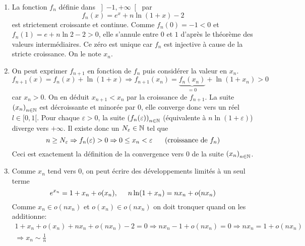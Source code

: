 \begin{enumerate}
  \item La fonction $f_n$ définie dans $\left] -1,+\infty\right[ $ par
\begin{displaymath}
  f_n(x) = e^x + n\ln(1+x) - 2
\end{displaymath}
est strictement croissante et continue. Comme $f_n(0)=-1<0$ et $f_n(1)=e+n\ln 2 - 2>0$, elle s'annule entre $0$ et $1$ d'après le théorème des valeurs intermédiaires. Ce zéro est unique car $f_n$ est injective à cause de la stricte croissance. On le note $x_n$.
  
  \item On peut exprimer $f_{n+1}$ en fonction de $f_n$ puis considérer la valeur en $x_n$.
\begin{displaymath}
f_{n+1}(x) = f_n(x) + \ln(1+x) \Rightarrow f_{n+1}(x_n) = \underset{=0}{\underbrace{f_n(x_n)}} + \ln(1+x_n) > 0
\end{displaymath}
car $x_n>0$. On en déduit $x_{n+1} < x_n$ par la croissance de $f_{n+1}$. La suite $\left( x_n\right)_{n\in \mathbb{N}}$ est décroissante et minorée par $0$, elle converge donc vers un réel $l\in [0,1[$.\newline
Pour chaque $\varepsilon >0$, la suite $\left( f_n(\varepsilon)\right)_{n\in \mathbb{N}}$ (équivalente à $n\ln(1+\varepsilon)$) diverge vers $+\infty$.\newline
Il existe donc un $N_\varepsilon\in \mathbb{N}$ tel que 
\begin{displaymath}
n\geq N_\varepsilon \Rightarrow f_n(\varepsilon) > 0 \Rightarrow 0 \leq x_n < \varepsilon\hspace{0.5cm}\text{ (croissance de $f_n$)} 
\end{displaymath}
Ceci est exactement la définition de la convergence vers $0$ de la suite $\left( x_n\right)_{n\in \mathbb{N}}$.

  \item Comme $x_n$ tend vers $0$, on peut écrire des développements limités à un seul terme
\begin{displaymath}
e^{x_n} = 1 +x_n + o(x_n),\hspace{0.5cm} n\ln(1+x_n) = nx_n + o(nx_n)  
\end{displaymath}
Comme $x_n \in o(nx_n)$ et $o(x_n)\in o(nx_n)$ on doit tronquer quand on les additionne:
\begin{multline*}
  1 + x_n + o(x_n) + nx_n + o(nx_n) -2 = 0\Rightarrow nx_n -1 +o(nx_n)=0 \Rightarrow nx_n = 1 + o(nx_n)\\
  \Rightarrow x_n \sim \frac{1}{n}
\end{multline*}


\end{enumerate}
